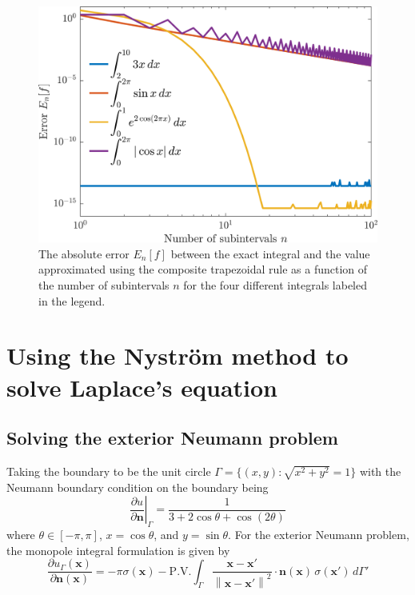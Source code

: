 \documentclass[11pt]{article}
\newcommand\p[2]{\frac{\partial #1}{\partial #2}}
\newcommand{\norm}[1]{\left\lVert#1\right\rVert}
\begin{document}
\begin{figure}[!htb]
  \centering
  \includegraphics[width=\linewidth]{trapezoid_error.png}
  \caption{The absolute error $E_n[f]$ between the exact integral and the value approximated using the composite trapezoidal rule as a function of the number of subintervals $n$ for the four different integrals labeled in the legend.}
  \label{fig:trapezoid_error}
\end{figure}

\section{Using the Nyström method to solve Laplace's equation}

\subsection{Solving the exterior Neumann problem}
Taking the boundary to be the unit circle $\Gamma = \{(x,y) : \sqrt{x^2 + y^2} = 1\}$ with the Neumann boundary condition on the boundary being
\begin{equation}
  \left. \p{u}{\bm{n}} \right\rvert_\Gamma =  \frac{1}{3 + 2\cos\theta + \cos(2\theta)}
\end{equation}
where $\theta \in [-\pi, \pi]$, $x = \cos\theta$, and $y = \sin\theta$. For the exterior Neumann problem, the monopole integral formulation is given by
\begin{equation}
  \p{u_\Gamma(\bm{x})}{\bm{n}(\bm{x})}
  = -\pi\sigma(\bm{x}) - \mathrm{P.V.}\int_\Gamma \frac{\bm{x-x'}}{\norm{\bm{x-x'}}^2} \cdot \bm{n}(\bm{x}) \, \sigma(\bm{x}') \, d\Gamma'
\end{equation}
\end{document}
